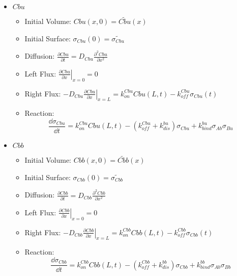 \documentclass[aps, prl, preprint]{revtex4-1}
\begin{document}
\begin{itemize}
\begin{itemize}
	\end{itemize}

\item $Cbu$
	\begin{itemize}
		\item Initial Volume: $Cbu(x,0) = \widetilde{Cbu}(x)$
		\item Initial Surface: $\sigma_{Cbu}(0) = \widetilde{\sigma_{Cbu}}$
		\item Diffusion: $\frac{\partial Cbu}{\partial t} = D_{Cbu}\frac{\partial^2Cbu}{\partial x^2}$
		\item Left Flux: $\left . \frac{\partial Cbu}{\partial x}\right | _{x=0} = 0$
		\item Right Flux: $\left . -D_{Cbu}\frac{\partial Cbu}{\partial x}\right |_{x=L} =k_{on}^{Cbu}Cbu(L,t) - k_{off}^{Cbu}\sigma_{Cbu}(t)$
		\item Reaction: $$\frac{\dd \sigma_{Cbu}}{\dd t}=k_{on}^{Cbu}Cbu(L,t)-(k_{off}^{Cbu}+k_{dis}^{bu})\sigma_{Cbu}+k_{bind}^{bu}\sigma_{Ab}\sigma_{Bu}$$
	
	\end{itemize}

\item $Cbb$
	\begin{itemize}
		\item Initial Volume: $Cbb(x,0) = \widetilde{Cbb}(x)$
		\item Initial Surface: $\sigma_{Cbb}(0) = \widetilde{\sigma_{Cbb}}$
		\item Diffusion: $\frac{\partial Cbb}{\partial t} = D_{Cbb}\frac{\partial^2Cbb}{\partial x^2}$
		\item Left Flux: $\left . \frac{\partial Cbb}{\partial x}\right | _{x=0} = 0$
		\item Right Flux: $\left . -D_{Cbb}\frac{\partial Cbb}{\partial x}\right |_{x=L} =k_{on}^{Cbb}Cbb(L,t) - k_{off}^{Cbb}\sigma_{Cbb}(t)$
		\item Reaction: $$\frac{\dd \sigma_{Cbb}}{\dd t}=k_{on}^{Cbb}Cbb(L,t)-(k_{off}^{Cbb}+k_{dis}^{bb})\sigma_{Cbb}+k_{bind}^{bb}\sigma_{Ab}\sigma_{Bb}$$
	
	\end{itemize}

\end{itemize}
\end{document}
